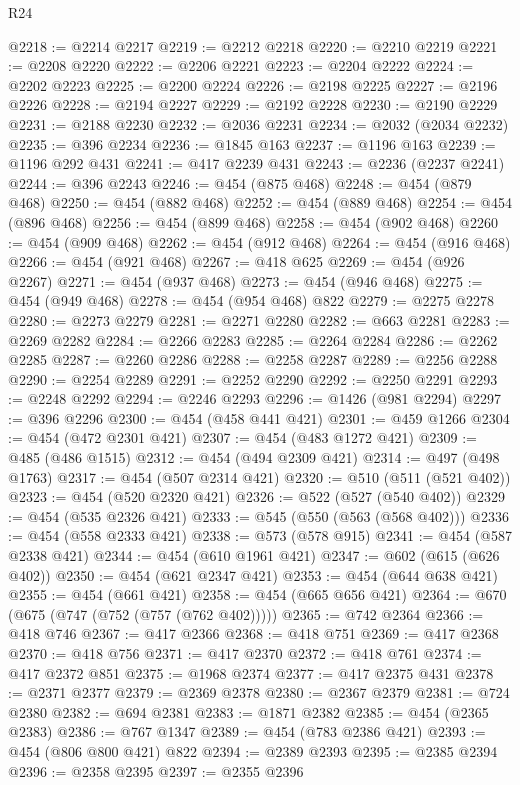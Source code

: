 \begin{lexlean}{R24}
\begin{coremodule}
@2218 := @2214 @2217
@2219 := @2212 @2218
@2220 := @2210 @2219
@2221 := @2208 @2220
@2222 := @2206 @2221
@2223 := @2204 @2222
@2224 := @2202 @2223
@2225 := @2200 @2224
@2226 := @2198 @2225
@2227 := @2196 @2226
@2228 := @2194 @2227
@2229 := @2192 @2228
@2230 := @2190 @2229
@2231 := @2188 @2230
@2232 := @2036 @2231
@2234 := @2032 (@2034 @2232)
@2235 := @396 @2234
@2236 := @1845 @163
@2237 := @1196 @163
@2239 := @1196 @292 @431
@2241 := @417 @2239 @431
@2243 := @2236 (@2237 @2241)
@2244 := @396 @2243
@2246 := @454 (@875 @468)
@2248 := @454 (@879 @468)
@2250 := @454 (@882 @468)
@2252 := @454 (@889 @468)
@2254 := @454 (@896 @468)
@2256 := @454 (@899 @468)
@2258 := @454 (@902 @468)
@2260 := @454 (@909 @468)
@2262 := @454 (@912 @468)
@2264 := @454 (@916 @468)
@2266 := @454 (@921 @468)
@2267 := @418 @625
@2269 := @454 (@926 @2267)
@2271 := @454 (@937 @468)
@2273 := @454 (@946 @468)
@2275 := @454 (@949 @468)
@2278 := @454 (@954 @468) @822
@2279 := @2275 @2278
@2280 := @2273 @2279
@2281 := @2271 @2280
@2282 := @663 @2281
@2283 := @2269 @2282
@2284 := @2266 @2283
@2285 := @2264 @2284
@2286 := @2262 @2285
@2287 := @2260 @2286
@2288 := @2258 @2287
@2289 := @2256 @2288
@2290 := @2254 @2289
@2291 := @2252 @2290
@2292 := @2250 @2291
@2293 := @2248 @2292
@2294 := @2246 @2293
@2296 := @1426 (@981 @2294)
@2297 := @396 @2296
@2300 := @454 (@458 @441 @421)
@2301 := @459 @1266
@2304 := @454 (@472 @2301 @421)
@2307 := @454 (@483 @1272 @421)
@2309 := @485 (@486 @1515)
@2312 := @454 (@494 @2309 @421)
@2314 := @497 (@498 @1763)
@2317 := @454 (@507 @2314 @421)
@2320 := @510 (@511 (@521 @402))
@2323 := @454 (@520 @2320 @421)
@2326 := @522 (@527 (@540 @402))
@2329 := @454 (@535 @2326 @421)
@2333 := @545 (@550 (@563 (@568 @402)))
@2336 := @454 (@558 @2333 @421)
@2338 := @573 (@578 @915)
@2341 := @454 (@587 @2338 @421)
@2344 := @454 (@610 @1961 @421)
@2347 := @602 (@615 (@626 @402))
@2350 := @454 (@621 @2347 @421)
@2353 := @454 (@644 @638 @421)
@2355 := @454 (@661 @421)
@2358 := @454 (@665 @656 @421)
@2364 := @670 (@675 (@747 (@752 (@757 (@762 @402)))))
@2365 := @742 @2364
@2366 := @418 @746
@2367 := @417 @2366
@2368 := @418 @751
@2369 := @417 @2368
@2370 := @418 @756
@2371 := @417 @2370
@2372 := @418 @761
@2374 := @417 @2372 @851
@2375 := @1968 @2374
@2377 := @417 @2375 @431
@2378 := @2371 @2377
@2379 := @2369 @2378
@2380 := @2367 @2379
@2381 := @724 @2380
@2382 := @694 @2381
@2383 := @1871 @2382
@2385 := @454 (@2365 @2383)
@2386 := @767 @1347
@2389 := @454 (@783 @2386 @421)
@2393 := @454 (@806 @800 @421) @822
@2394 := @2389 @2393
@2395 := @2385 @2394
@2396 := @2358 @2395
@2397 := @2355 @2396

\end{coremodule}
\end{lexlean}

